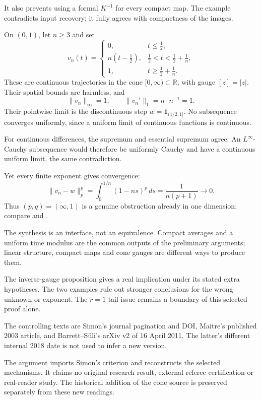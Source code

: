 \documentclass[12pt,reqno]{amsart}
\begin{document}
It also prevents using a formal $K^{-1}$ for every compact map. The example contradicts input recovery; it fully agrees with compactness of the images.

On $(0,1)$, let $n\ge3$ and set
\[
v_n(t)=\begin{cases}
0,&t\le\tfrac12,\\
n(t-\tfrac12),&\tfrac12<t<\tfrac12+\tfrac1n,\\
1,&t\ge\tfrac12+\tfrac1n.
\end{cases}
\]
These are continuous trajectories in the cone $[0,\infty)\subset\mathbb R$, with gauge $[z]=|z|$. Their spatial bounds are harmless, and
\[
\|v_n\|_\infty=1,\qquad \|v_n'\|_1=n\cdot n^{-1}=1.
\]
Their pointwise limit is the discontinuous step $w=\mathbf1_{(1/2,1]}$. No subsequence converges uniformly, since a uniform limit of continuous functions is continuous.

For continuous differences, the supremum and essential supremum agree. An $L^\infty$-Cauchy subsequence would therefore be uniformly Cauchy and have a continuous uniform limit, the same contradiction.

Yet every finite exponent gives convergence:
\begin{equation}\label{eq:ramp}
\|v_n-w\|_p^p=\int_0^{1/n}(1-ns)^p\,ds
=\frac1{n(p+1)}\longrightarrow0.
\end{equation}
Thus $(p,q)=(\infty,1)$ is a genuine obstruction already in one dimension; compare \cite[Proposition 3, p.~94]{S-simon} and \cite[Remark 2, p.~4]{S-barrett-suli}.

The synthesis is an interface, not an equivalence. Compact averages and a uniform time modulus are the common outputs of the preliminary arguments; linear structure, compact maps and cone gauges are different ways to produce them.

The inverse-gauge proposition gives a real implication under its stated extra hypotheses. The two examples rule out stronger conclusions for the wrong unknown or exponent. The $r=1$ tail issue remains a boundary of this selected proof alone.

The controlling texts are Simon's journal pagination and DOI, Maitre's published 2003 article, and Barrett--S\"uli's arXiv v2 of 16 April 2011. The latter's different internal 2018 date is not used to infer a new version.

The argument imports Simon's criterion and reconstructs the selected mechanisms. It claims no original research result, external referee certification or real-reader study. The historical addition of the cone source is preserved separately from these new readings.



\end{document}
